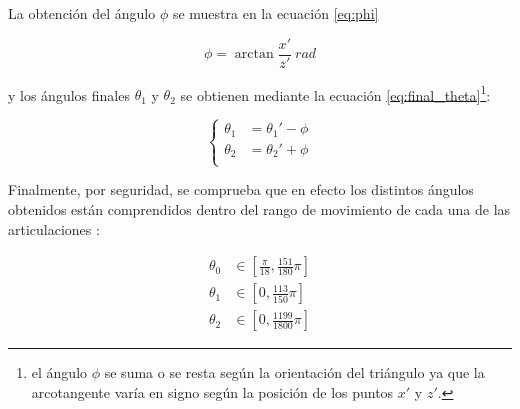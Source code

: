 La obtención del ángulo $\phi$ se muestra en la ecuación \ref{eq:phi}

\begin{equation}\label{eq:phi}
    \phi = \arctan{\frac{x'}{z'}}~rad
\end{equation}

y los ángulos finales $\theta_1$ y $\theta_2$ se obtienen mediante la ecuación
\ref{eq:final_theta}\footnote{el ángulo $\phi$ se suma o se resta según la orientación
del triángulo ya que la arcotangente varía en signo según la posición de los puntos
$x'$ y $z'$.}:

\begin{equation}\label{eq:final_theta}
    \left\{
        \begin{aligned}
            \theta_1 &= \theta_1' - \phi \\
            \theta_2 &= \theta_2' + \phi \\
        \end{aligned}
    \right.
\end{equation}

Finalmente, por seguridad, se comprueba que en efecto los distintos ángulos obtenidos
están comprendidos dentro del rango de movimiento de cada una de las articulaciones
\cite{UArmDeveloperSwiftProForArduino}:

\begin{align*}
    \theta_0 &\in \left[\frac{\pi}{18}, \frac{151}{180}\pi\right] \\
    \theta_1 &\in \left[0, \frac{113}{150}\pi\right] \\
    \theta_2 &\in \left[0, \frac{1199}{1800}\pi\right]
\end{align*}